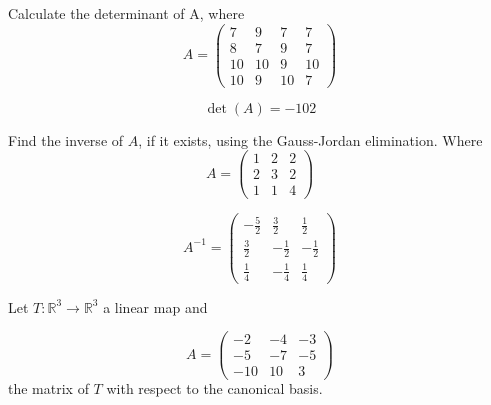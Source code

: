 \begin{questions}

\question Calculate the determinant of A, where
$$
A=\left(\begin{array}{rrrr}
7 & 9 & 7 & 7 \\
8 & 7 & 9 & 7 \\
10 & 10 & 9 & 10 \\
10 & 9 & 10 & 7
\end{array}\right)
$$

\begin{solution}
$$\det(A)=-102$$
\end{solution}

\question Find the inverse of $A$, if it exists, using the Gauss-Jordan elimination. Where
$$
A=\left(\begin{array}{rrr}
1 & 2 & 2 \\
2 & 3 & 2 \\
1 & 1 & 4
\end{array}\right)
$$

\begin{solution}
$$A^{-1}=\left(\begin{array}{rrr}
-\frac{5}{2} & \frac{3}{2} & \frac{1}{2} \\
\frac{3}{2} & -\frac{1}{2} & -\frac{1}{2} \\
\frac{1}{4} & -\frac{1}{4} & \frac{1}{4}
\end{array}\right)$$
\end{solution}

\question Let $T:\mathbb{R}^3\rightarrow\mathbb{R}^3$  a linear map and
 
$$
A=\left(\begin{array}{rrr}
-2 & -4 & -3 \\
-5 & -7 & -5 \\
-10 & 10 & 3
\end{array}\right)
$$
the matrix of $T$ with respect to the canonical basis.
\end{questions}
